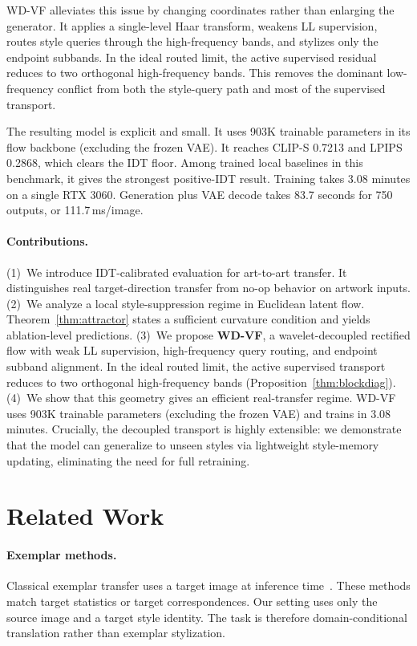 \documentclass[letterpaper]{article}
\begin{document}
WD-VF alleviates this issue by changing coordinates rather than enlarging the generator.
It applies a single-level Haar transform, weakens LL supervision, routes style queries through the high-frequency bands, and stylizes only the endpoint subbands.
In the ideal routed limit, the active supervised residual reduces to two orthogonal high-frequency bands.
This removes the dominant low-frequency conflict from both the style-query path and most of the supervised transport.

The resulting model is explicit and small.
It uses 903K trainable parameters in its flow backbone (excluding the frozen VAE).
It reaches CLIP-S 0.7213 and LPIPS 0.2868, which clears the IDT floor.
Among trained local baselines in this benchmark, it gives the strongest positive-IDT result.
Training takes 3.08 minutes on a single RTX 3060.
Generation plus VAE decode takes 83.7 seconds for 750 outputs, or 111.7\,ms/image.

\paragraph{Contributions.}
(1)~We introduce IDT-calibrated evaluation for art-to-art transfer.
It distinguishes real target-direction transfer from no-op behavior on artwork inputs.
(2)~We analyze a local style-suppression regime in Euclidean latent flow.
Theorem~\ref{thm:attractor} states a sufficient curvature condition and yields ablation-level predictions.
(3)~We propose \textbf{WD-VF}, a wavelet-decoupled rectified flow with weak LL supervision, high-frequency query routing, and endpoint subband alignment.
In the ideal routed limit, the active supervised transport reduces to two orthogonal high-frequency bands (Proposition~\ref{thm:blockdiag}).
(4)~We show that this geometry gives an efficient real-transfer regime. WD-VF uses 903K trainable parameters (excluding the frozen VAE) and trains in 3.08 minutes. Crucially, the decoupled transport is highly extensible: we demonstrate that the model can generalize to unseen styles via lightweight style-memory updating, eliminating the need for full retraining.

\section{Related Work}
\label{sec:related}

\paragraph{Exemplar methods.}
Classical exemplar transfer uses a target image at inference time~\cite{gatys2015neural,gatys2016image,huang2017adain,li2017universal,deng2022stytr2,huang2024aesfa}.
These methods match target statistics or target correspondences.
Our setting uses only the source image and a target style identity.
The task is therefore domain-conditional translation rather than exemplar stylization.
\end{document}
